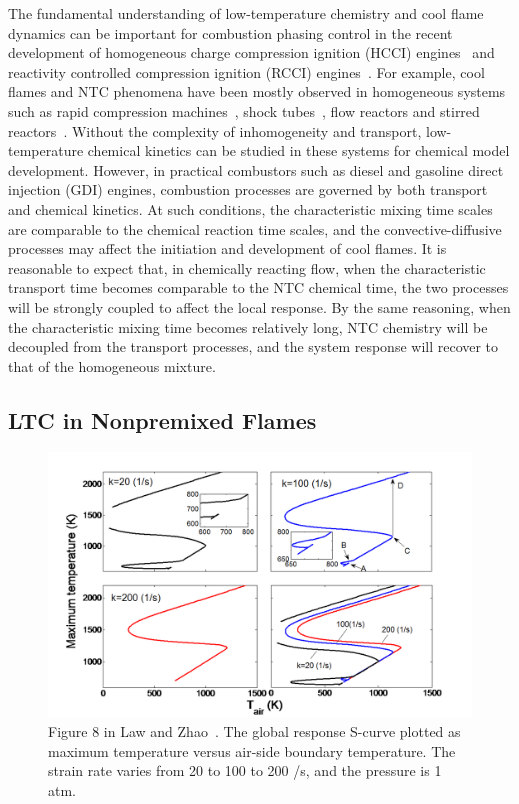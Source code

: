 The fundamental understanding of low-temperature chemistry and cool flame dynamics can be important for combustion phasing control in the recent development of homogeneous charge compression ignition (HCCI) engines~\cite{lu11} and reactivity controlled compression ignition (RCCI) engines~\cite{kokjohn11}.  For example, cool flames and NTC phenomena have been mostly observed in homogeneous systems such as rapid compression machines~\cite{silke05,mittal08,di14}, shock tubes~\cite{ciezki93,herzler05,vasu08}, flow reactors\cite{koert94,curran00} and stirred reactors~\cite{dagaut95,veloo13,kikui15}.  Without the complexity of inhomogeneity and transport, low-temperature chemical kinetics can be studied in these systems for chemical model development.  However, in practical combustors such as diesel and gasoline direct injection (GDI) engines, combustion processes are governed by both transport and chemical kinetics.  At such conditions, the characteristic mixing time scales are comparable to the chemical reaction time scales, and the convective-diffusive processes may affect the initiation and development of cool flames.  It is reasonable to expect that, in chemically reacting flow, when the characteristic transport time becomes comparable to the NTC chemical time, the two processes will be strongly coupled to affect the local response.  By the same reasoning, when the characteristic mixing time becomes relatively long, NTC chemistry will be decoupled from the transport processes, and the system response will recover to that of the homogeneous mixture.

\subsection{LTC in Nonpremixed Flames}\label{sec:intro-NTC-nonpremixed}

\begin{figure}[t]
  \centering
  \scriptsize
  \includegraphics[width=1.0\textwidth]{ch-intro/scurve-zhao.png}
  \normalsize
  \caption{Figure 8 in Law and Zhao~\cite{law12}.  The global response S-curve plotted as maximum temperature versus air-side boundary temperature.  The strain rate varies from 20 to 100 to 200 /s, and the pressure is 1 atm.}
  \label{fig:scurve-zhao}
\end{figure}

